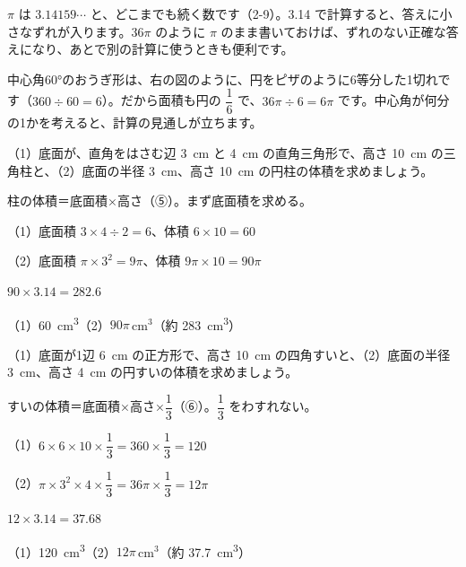 \noindent\begin{minipage}[c]{0.62\linewidth}
$\pi$ は $3.14159\cdots$ と、どこまでも続く数です（2-9）。3.14 で計算すると、答えに小さなずれが入ります。$36\pi$ のように $\pi$ のまま書いておけば、ずれのない正確な答えになり、あとで別の計算に使うときも便利です。

中心角60°のおうぎ形は、右の図のように、円をピザのように6等分した1切れです（$360\div60=6$）。だから面積も円の $\dfrac{1}{6}$ で、$36\pi\div6=6\pi$ です。中心角が何分の1かを考えると、計算の見通しが立ちます。
\end{minipage}\hfill
\begin{minipage}[c]{0.34\linewidth}\centering
{}
\end{minipage}

\begin{reidai}[柱の体積]
（1）底面が、直角をはさむ辺 \qty{3}{cm} と \qty{4}{cm} の直角三角形で、高さ \qty{10}{cm} の三角柱と、（2）底面の半径 \qty{3}{cm}、高さ \qty{10}{cm} の円柱の体積を求めましょう。\par
\kangaekata 柱の体積＝底面積×高さ（⑤）。まず底面積を求める。\par
\shiki（1）底面積 $3\times4\div2=6$、体積 $6\times10=60$\par
\hspace*{2.6\zw}（2）底面積 $\pi\times3^2=9\pi$、体積 $9\pi\times10=90\pi$\par
\hspace*{4.6\zw}$90\times3.14=282.6$\par
\kotae（1）\qty{60}{cm^3}\quad（2）$90\pi$\,cm$^3$（約 \qty{283}{cm^3}）
\end{reidai}

\begin{reidai}[すいの体積]
（1）底面が1辺 \qty{6}{cm} の正方形で、高さ \qty{10}{cm} の四角すいと、（2）底面の半径 \qty{3}{cm}、高さ \qty{4}{cm} の円すいの体積を求めましょう。\par
\kangaekata すいの体積＝底面積×高さ×$\dfrac{1}{3}$（⑥）。$\dfrac{1}{3}$ をわすれない。\par
\shiki（1）$6\times6\times10\times\dfrac{1}{3}=360\times\dfrac{1}{3}=120$\par
\hspace*{2.6\zw}（2）$\pi\times3^2\times4\times\dfrac{1}{3}=36\pi\times\dfrac{1}{3}=12\pi$\par
\hspace*{4.6\zw}$12\times3.14=37.68$\par
\kotae（1）\qty{120}{cm^3}\quad（2）$12\pi$\,cm$^3$（約 \qty{37.7}{cm^3}）
\end{reidai}

